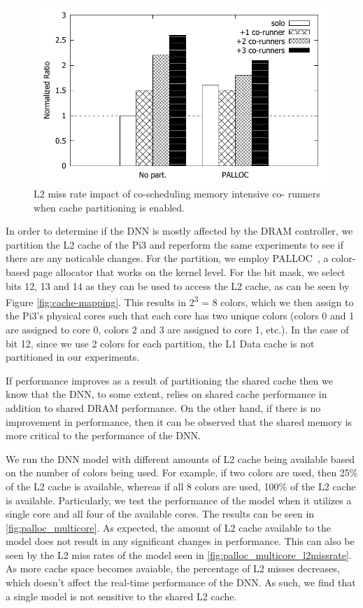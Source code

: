 \begin{figure}[h]
  \centering
  \includegraphics[width=.7\textwidth]{figs/palloc_bandwidth_l2missrate}
  \caption{L2 miss rate impact of co-scheduling memory intensive co-
runners when cache partitioning is enabled.}
  \label{fig:palloc_bandwidth_l2missrate}
\end{figure}

In order to determine if the DNN is mostly affected by the DRAM 
controller, we partition the L2 cache of the Pi3 and reperform the 
same experiments to see if there are any noticable changes. For the 
partition, we employ PALLOC~\cite{yun2014rtas}, a color-based page 
allocator that works on the kernel level. For the bit mask, we select 
bits 12, 13 and 14 as they can be used to access the L2 cache,
as can be seen by Figure \ref{fig:cache-mapping}. This results in 
2\textsuperscript{3} = 8 colors, which we then assign to the Pi3's 
physical cores such that each core has two unique colors (colors 0 
and 1 are assigned to core 0, colors 2 and 3 are assigned to core 1, 
etc.). In the case of bit 12, since we use 2 colors for each partition,
the L1 Data cache is not partitioned in our experiments.

If performance improves as a result of partitioning the shared cache 
then we know that the DNN, to some extent, relies on shared cache 
performance in addition to shared DRAM performance. On the other 
hand, if there is no improvement in performance, then it can be 
observed that the shared memory is more critical to the performance 
of the DNN.

We run the DNN model with different amounts of L2 cache being
available based on the number of colors being used. For example, if two 
colors are used, then 25\% of the L2 cache is available, whereas if all 
8 colors are used, 100\% of the L2 cache is available. Particularly, we 
test the performance of the model when it utilizes a single core and
all four of the available cores. The results can be seen in 
\ref{fig:palloc_multicore}. As expected, the amount of L2 cache 
available to the model does not result in any significant changes in 
performance. This can also be seen by the L2 miss rates of the model 
seen in \ref{fig:palloc_multicore_l2missrate}. As more cache space 
becomes avaiable, the percentage of L2 misses decreases, which doesn't 
affect the real-time performance of the DNN. As such, we find that a 
single model is not sensitive to the shared L2 cache.

